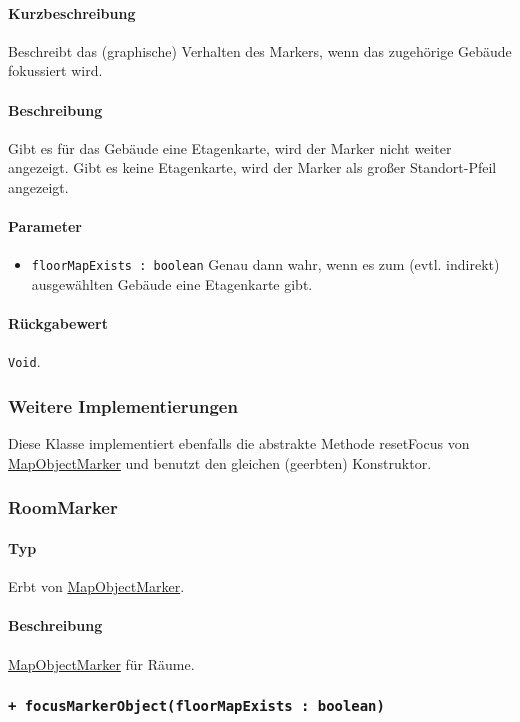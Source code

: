 \paragraph*{Kurzbeschreibung}
Beschreibt das (graphische) Verhalten des Markers, wenn das zugehörige Gebäude fokussiert wird.
\paragraph*{Beschreibung}
Gibt es für das Gebäude eine Etagenkarte, wird der Marker nicht weiter angezeigt.
Gibt es keine Etagenkarte, wird der Marker als großer Standort-Pfeil angezeigt.
\paragraph*{Parameter}
\begin{itemize}
    \item \texttt{floorMapExists : boolean} Genau dann wahr, wenn es zum (evtl. indirekt) ausgewählten Gebäude eine Etagenkarte gibt.
\end{itemize}
\paragraph*{Rückgabewert}
\texttt{Void}.

\subsubsection*{Weitere Implementierungen}
Diese Klasse implementiert ebenfalls die abstrakte Methode resetFocus von \hyperref[App_Map_View_MapObjectMarker]{MapObjectMarker} 
und benutzt den gleichen (geerbten) Konstruktor.

\subsubsection{RoomMarker}\label{App_Map_View_RoomMarker}
\paragraph*{Typ} 
Erbt von \hyperref[App_Map_View_MapObjectMarker]{MapObjectMarker}.
\paragraph*{Beschreibung}
\hyperref[App_Map_View_MapObjectMarker]{MapObjectMarker} für Räume.

\subsubsection*{\texttt{+ focusMarkerObject(floorMapExists : boolean)}}%
